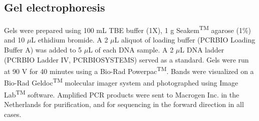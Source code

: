 

\subsection{Gel electrophoresis}
Gels were prepared using 100 mL TBE buffer (1X), 1 g Seakem\textsuperscript{TM} agarose (1\%) and 10 $\mu$L ethidium bromide. A 2 $\mu$L aliquot of loading buffer (PCRBIO Loading Buffer A) was added to 5 $\mu$L of each DNA sample. A 2 $\mu$L DNA ladder (PCRBIO Ladder IV, PCRBIOSYSTEMS) served as a standard. Gels were run at 90 V for 40 minutes using a Bio-Rad Powerpac\textsuperscript{TM}. Bands were visualized on a Bio-Rad Geldoc\textsuperscript{TM} molecular imager system and photographed using Image Lab\textsuperscript{TM} software. Amplified PCR products were sent to Macrogen Inc. in the Netherlands for purification, and for sequencing in the forward direction in all cases. 

